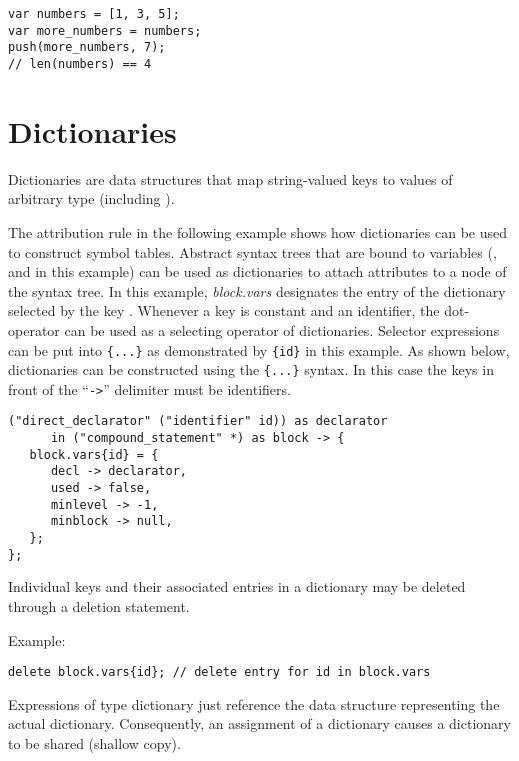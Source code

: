 \begin{lstlisting}
var numbers = [1, 3, 5];
var more_numbers = numbers;
push(more_numbers, 7);
// len(numbers) == 4
\end{lstlisting}

\section{Dictionaries}\label{dictionary}

Dictionaries are data structures that map string-valued keys
to values of arbitrary type (including ).

The attribution rule in the following example shows how dictionaries
can be used to construct symbol tables. Abstract syntax trees that
are bound to variables (,  and 
in this example) can be used as dictionaries to attach attributes to
a node of the syntax tree. In this example, \textit{block.vars}
designates the entry of the dictionary  selected
by the key . Whenever a key is constant and an identifier,
the dot-operator can be used as a selecting operator of dictionaries.
Selector expressions can be put into \lstinline!{...}! as demonstrated
by \lstinline!{id}! in this example. As shown below, dictionaries
can be constructed using the \lstinline!{...}! syntax. In this
case the keys in front of the ``\lstinline!->!'' delimiter must be
identifiers.

\begin{lstlisting}
("direct_declarator" ("identifier" id)) as declarator
      in ("compound_statement" *) as block -> {
   block.vars{id} = {
      decl -> declarator,
      used -> false,
      minlevel -> -1,
      minblock -> null,
   };
};
\end{lstlisting}

\noindent
Individual keys and their associated entries in a dictionary
may be deleted through a deletion statement.

\bigskip
\noindent
Example:

\begin{lstlisting}
delete block.vars{id}; // delete entry for id in block.vars
\end{lstlisting}

\noindent
Expressions of type dictionary just reference the data structure
representing the actual dictionary. Consequently, an assignment of a
dictionary causes a dictionary to be shared
(shallow copy).

